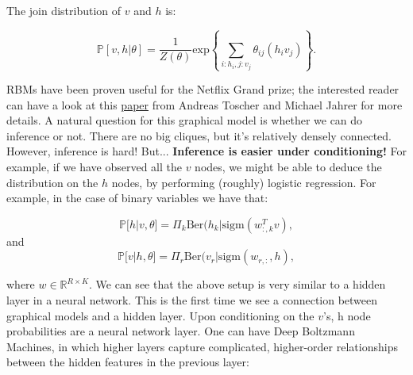 \documentclass{article}
\begin{document}
The join distribution of $v$ and $h$ is:

    \[  \mathbb{P}[ v, h | \theta] = \frac{1}{Z(\theta)} \mathrm{exp} \left\{\sum_{i:h_i, j:v_j} \theta_{ij}(h_{i}v_j) \right\}.  \] 


RBMs have been proven useful for the Netflix Grand prize; the interested reader can have a look at this \href{https://www.netflixprize.com/assets/GrandPrize2009_BPC_BigChaos.pdf}{paper} from Andreas Toscher and Michael Jahrer for more details. A natural question for this graphical model is whether we can do inference or not. There are no big cliques, but it's relatively densely connected. However, inference is hard! But... 
\textbf{Inference is easier under conditioning!} For example, if we have observed all the $v$ nodes, we might be able to deduce the distribution on the $h$ nodes, by performing (roughly) logistic regression. For example, in the case of binary variables we have that:


    \[  \mathbb{P}[ h | v , \theta] = \Pi_k \mathrm{Ber}(h_k|\mathrm{sigm}(w^T_{:,k}v),  \]
and
    \[  \mathbb{P}[ v | h , \theta] = \Pi_r \mathrm{Ber}(v_r|\mathrm{sigm}(w_{r,:},h),  \]

where $w \in \mathbb{R}^{R \times K}$.  We can see that the above setup is very similar to a hidden layer in a neural network. This is the first time we see a connection between graphical models and a hidden layer. Upon conditioning on the $v$'s, h node probabilities are a neural network layer. One can have Deep Boltzmann Machines, in which higher layers capture complicated, higher-order relationships between the hidden features in the previous layer:
\end{document}

